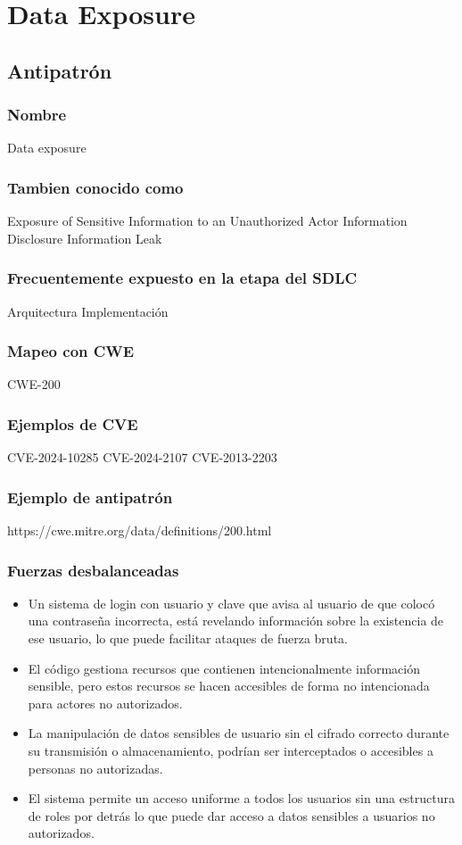 \chapter{Data Exposure}
\section{Antipatrón}
\subsection{Nombre}
Data exposure
\subsection{Tambien conocido como}
Exposure of Sensitive Information to an Unauthorized Actor
Information Disclosure
Information Leak
\subsection{Frecuentemente expuesto en la etapa del SDLC}
Arquitectura
Implementación
\subsection{Mapeo con CWE}
CWE-200
\subsection{Ejemplos de CVE}
CVE-2024-10285
CVE-2024-2107
CVE-2013-2203 
\subsection{Ejemplo de antipatrón}
https://cwe.mitre.org/data/definitions/200.html
\subsection{Fuerzas desbalanceadas}
\begin{itemize}
    \item Un sistema de login con usuario y clave que avisa al usuario de que colocó una contraseña incorrecta, está revelando información sobre la existencia de ese usuario, lo que puede facilitar ataques de fuerza bruta.
    \item El código gestiona recursos que contienen intencionalmente información sensible, pero estos recursos se hacen accesibles de forma no intencionada para actores no autorizados. 
    \item La manipulación de datos sensibles de usuario sin el cifrado correcto durante su transmisión o almacenamiento, podrían ser interceptados o accesibles a personas no autorizadas. 
    \item El sistema permite un acceso uniforme a todos los usuarios sin una estructura de roles por detrás lo que puede dar acceso a datos sensibles a usuarios no autorizados.
\end{itemize}
